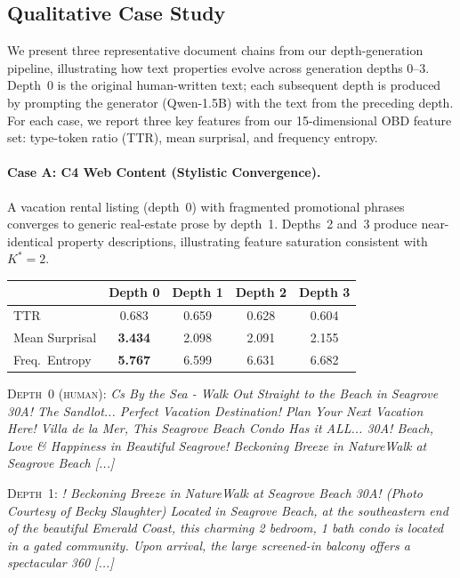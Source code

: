 \subsection{Qualitative Case Study}
\label{app:case-study}

We present three representative document chains from our depth-generation pipeline, illustrating how text properties evolve across generation depths 0--3.
Depth~0 is the original human-written text; each subsequent depth is produced by prompting the generator (Qwen-1.5B) with the text from the preceding depth.
For each case, we report three key features from our 15-dimensional OBD feature set: type-token ratio (TTR), mean surprisal, and frequency entropy.

\paragraph{Case A: C4 Web Content (Stylistic Convergence).}
A vacation rental listing (depth~0) with fragmented promotional phrases converges to generic real-estate prose by depth~1. Depths~2 and~3 produce near-identical property descriptions, illustrating feature saturation consistent with $K^*{=}2$.

\begin{center}
{\footnotesize
\begin{tabular}{lcccc}
\toprule
& \textbf{Depth 0} & \textbf{Depth 1} & \textbf{Depth 2} & \textbf{Depth 3} \\
\midrule
TTR & 0.683 & 0.659 & 0.628 & 0.604 \\
Mean Surprisal & \textbf{3.434} & 2.098 & 2.091 & 2.155 \\
Freq.\ Entropy & \textbf{5.767} & 6.599 & 6.631 & 6.682 \\
\bottomrule
\end{tabular}}
\end{center}

\noindent\textsc{Depth~0 (human):} {\small\itshape Cs By the Sea - Walk Out Straight to the Beach in Seagrove 30A! The Sandlot... Perfect Vacation Destination! Plan Your Next Vacation Here! Villa de la Mer, This Seagrove Beach Condo Has it ALL... 30A! Beach, Love \& Happiness in Beautiful Seagrove! Beckoning Breeze in NatureWalk at Seagrove Beach [...]}
\smallskip

\noindent\textsc{Depth~1:} {\small\itshape ! Beckoning Breeze in NatureWalk at Seagrove Beach 30A! (Photo Courtesy of Becky Slaughter) Located in Seagrove Beach, at the southeastern end of the beautiful Emerald Coast, this charming 2 bedroom, 1 bath condo is located in a gated community. Upon arrival, the large screened-in balcony offers a spectacular 360 [...]}
\smallskip

